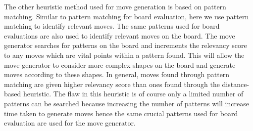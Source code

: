 \documentclass{l4proj}
\begin{document}
The other heuristic method used for move generation is based on pattern matching. Similar to pattern matching for board evaluation, here we use pattern matching to identify relevant moves. The same patterns used for board evaluations are also used to identify relevant moves on the board. The move generator searches for patterns on the board and increments the relevancy score to any moves which are vital points within a pattern found. This will allow the move generator to consider more complex shapes on the board and generate moves according to these shapes. In general, moves found through pattern matching are given higher relevancy score than ones found through the distance-based heuristic. The flaw in this heuristic is of course only a limited number of patterns can be searched because increasing the number of patterns will increase time taken to generate moves hence the same crucial patterns used for board evaluation are used for the move generator.
\end{document}
